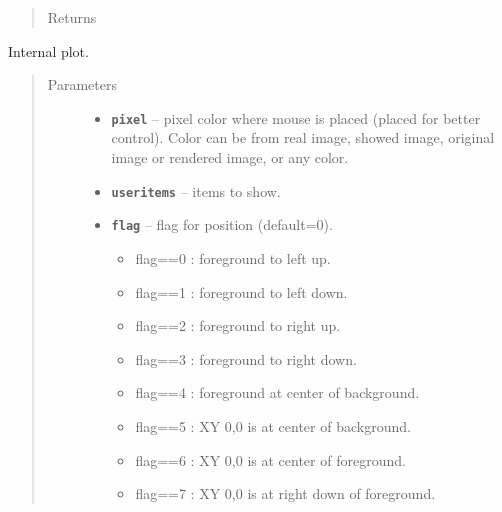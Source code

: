 \documentclass[letterpaper,10pt,english]{sphinxmanual}
\begin{document}
\begin{fulllineitems}
\begin{fulllineitems}
\begin{quote}
\begin{description}
\item[{Returns}] \leavevmode


\end{description}\end{quote}

\end{fulllineitems}


\begin{fulllineitems}
\label{RRtoolbox.lib:RRtoolbox.lib.plotter.Plotim.builtinplot}
Internal plot.
\begin{quote}\begin{description}
\item[{Parameters}] \leavevmode\begin{itemize}
\item {} 
\textbf{\texttt{pixel}} -- pixel color where mouse is placed (placed for better control). Color can be from
real image, showed image, original image or rendered image, or any color.

\item {} 
\textbf{\texttt{useritems}} -- items to show.

\item {} 
\textbf{\texttt{flag}} -- 
flag for position (default=0).
\begin{itemize}
\item {} 
flag==0 : foreground to left up.

\item {} 
flag==1 : foreground to left down.

\item {} 
flag==2 : foreground to right up.

\item {} 
flag==3 : foreground to right down.

\item {} 
flag==4 : foreground at center of background.

\item {} 
flag==5 : XY 0,0 is at center of background.

\item {} 
flag==6 : XY 0,0 is at center of foreground.

\item {} 
flag==7 : XY 0,0 is at right down of foreground.


\end{itemize}
\end{itemize}
\end{description}
\end{quote}
\end{fulllineitems}
\end{fulllineitems}
\end{document}
